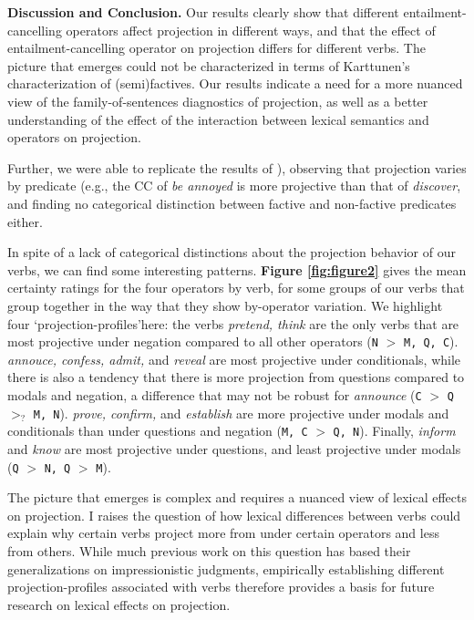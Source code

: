\documentclass[12pt, a4paper]{article}
\begin{document}

\noindent
{\bf Discussion and Conclusion.} 
	Our results clearly show that different entailment-cancelling operators affect projection in different ways, and that the effect of entailment-cancelling operator on projection differs for different verbs. The picture that emerges could not be characterized in terms of Karttunen's characterization of (semi)factives. Our results indicate a need for a more nuanced view of the family-of-sentences diagnostics of projection, as well as a better understanding of the effect of the interaction between lexical semantics and operators on projection.

	Further, we were able to replicate the results of \citealp{degen_are_2022}), observing that projection varies by predicate (e.g., the CC of \emph{be annoyed} is more projective than that of \emph{discover}, and finding no categorical distinction between factive and non-factive predicates either.

	In spite of a lack of categorical distinctions about the projection behavior of our verbs, we can find some interesting patterns. \textbf{Figure \ref{fig:figure2}} gives the mean certainty ratings for the four operators by verb, for some groups of our verbs that group together in the way that they show by-operator variation. We highlight four \lq projection-profiles\rq here: the verbs \emph{pretend, think} are the only verbs that are most projective under negation compared to all other operators (\texttt{N} $>$ \texttt{M, Q, C}). \emph{annouce, confess, admit,} and \emph{reveal} are most projective under conditionals, while there is also a tendency that there is more projection from questions compared to modals and negation, a difference that may not be robust for \emph{announce} (\texttt{C} $>$ \texttt{Q} \textcolor{gray!40}{$>_?$} \texttt{M, N}). \emph{prove, confirm,} and \emph{establish} are more projective under modals and conditionals than under questions and negation (\texttt{M, C} $>$ \texttt{Q, N}). Finally, \emph{inform} and \emph{know} are most projective under questions, and least projective under modals (\texttt{Q} $>$ \texttt{N, Q} $>$ \texttt{M}).

	The picture that emerges is complex and requires a nuanced view of lexical effects on projection. I raises the question of how lexical differences between verbs could explain why certain verbs project more from under certain operators and less from others. While much previous work on this question has based their generalizations on impressionistic judgments, empirically establishing different projection-profiles associated with verbs therefore provides a basis for future research on lexical effects on projection.
\end{document}
